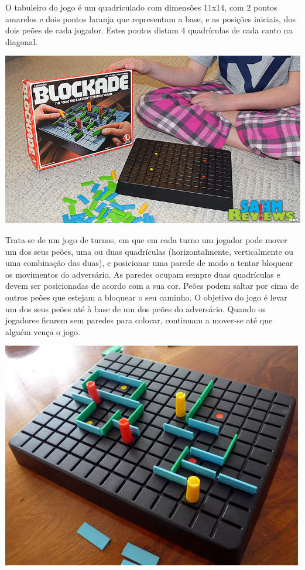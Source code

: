 \documentclass[a4paper]{article}
\begin{document}
O tabuleiro do jogo é um quadriculado com dimensões 11x14, com 2 pontos amarelos e dois pontos laranja que representam a base, e as posições iniciais, dos dois peões de cada jogador. Estes pontos distam 4 quadrículas de cada canto na diagonal. 

\begin{center}
\includegraphics[scale = 0.3]{fig1.jpg}
\end{center}

Trata-se de um jogo de turnos, em que em cada turno um jogador pode mover um dos seus peões, uma ou duas quadrículas (horizontalmente, verticalmente ou uma combinação das duas), e posicionar uma parede de modo a tentar bloquear os movimentos do adversário.
As paredes ocupam sempre duas quadrículas e devem ser posicionadas de acordo com a sua cor. Peões podem saltar por cima de outros peões que estejam a bloquear o seu caminho.
O objetivo do jogo é levar um dos seus peões até à base de um dos peões do adversário. Quando os jogadores ficarem sem paredes para colocar, continuam a mover-se até que alguém vença o jogo. 

\begin{center}
\includegraphics[scale = 0.4]{fig2.jpg}
\end{center}
\end{document}
